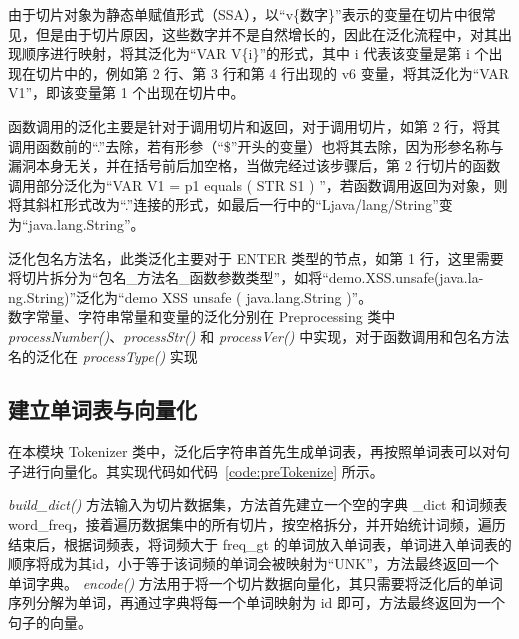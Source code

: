 由于切片对象为静态单赋值形式（SSA），以“v\{数字\}”表示的变量在切片中很常见，但是由于切片原因，这些数字并不是自然增长的，因此在泛化流程中，对其出现顺序进行映射，将其泛化为“VAR V\{i\}”的形式，其中 i 代表该变量是第 i 个出现在切片中的，例如第 2 行、第 3 行和第 4 行出现的 v6 变量，将其泛化为“VAR V1”，即该变量第 1 个出现在切片中。

函数调用的泛化主要是针对于调用切片和返回，对于调用切片，如第 2 行，将其调用函数前的“.”去除，若有形参（“\$”开头的变量）也将其去除，因为形参名称与漏洞本身无关，并在括号前后加空格，当做完经过该步骤后，第 2 行切片的函数调用部分泛化为“VAR V1 = p1 equals ( STR S1 ) ”，若函数调用返回为对象，则将其斜杠形式改为“.”连接的形式，如最后一行中的“Ljava/lang/String”变为“java.lang.String”。

泛化包名方法名，此类泛化主要对于 ENTER 类型的节点，如第 1 行，这里需要将切片拆分为“包名\_方法名\_函数参数类型”，如将“demo.XSS.unsafe(java.la-\\ng.String)”泛化为“demo XSS unsafe ( java.lang.String )”。\\

数字常量、字符串常量和变量的泛化分别在 Preprocessing 类中 \textit{processNumber()}、\textit{processStr()} 和 \textit{processVer()} 中实现，对于函数调用和包名方法名的泛化在 \textit{processType()} 实现

\subsection{建立单词表与向量化}

在本模块 Tokenizer 类中，泛化后字符串首先生成单词表，再按照单词表可以对句子进行向量化。其实现代码如代码~\ref{code:preTokenize} 所示。

\begin{minipage}[!htbp]{0.9\textwidth}
    
\end{minipage}

\textit{build\_dict()} 方法输入为切片数据集，方法首先建立一个空的字典 \_dict 和词频表 word\_freq，接着遍历数据集中的所有切片，按空格拆分，并开始统计词频，遍历结束后，根据词频表，将词频大于 freq\_gt 的单词放入单词表，单词进入单词表的顺序将成为其id，小于等于该词频的单词会被映射为“UNK”，方法最终返回一个单词字典。
\textit{encode()} 方法用于将一个切片数据向量化，其只需要将泛化后的单词序列分解为单词，再通过字典将每一个单词映射为 id 即可，方法最终返回为一个句子的向量。\\

